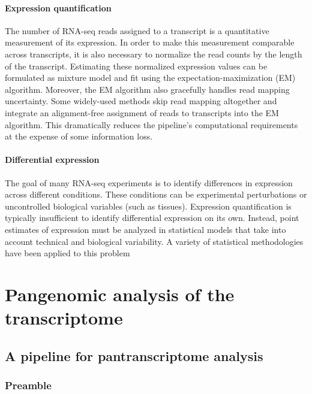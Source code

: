 \documentclass[11pt]{ucthesis}
\begin{document}
\subsection{Expression quantification}

The number of RNA-seq reads assigned to a transcript is a quantitative measurement of its expression. In order to make this measurement comparable across transcripts, it is also necessary to normalize the read counts by the length of the transcript\cite{wagner2012measurement,patro2017salmon}. Estimating these normalized expression values can be formulated as mixture model and fit using the expectation-maximization (EM) algorithm\cite{li2009rna}. Moreover, the EM algorithm also gracefully handles read mapping uncertainty. Some widely-used methods skip read mapping altogether and integrate an alignment-free assignment of reads to transcripts into the EM algorithm\cite{bray2016near,patro2017salmon}. This dramatically reduces the pipeline's computational requirements at the expense of some information loss.

\subsection{Differential expression}

The goal of many RNA-seq experiments is to identify differences in expression across different conditions. These conditions can be experimental perturbations or uncontrolled biological variables (such as tissues). Expression quantification is typically insufficient to identify differential expression on its own. Instead, point estimates of expression must be analyzed in statistical models that take into account technical and biological variability. A variety of statistical methodologies have been applied to this problem\cite{robinson2010edger,tarazona2011differential,love2014moderated,law2014voom}

\part{Pangenomic analysis of the transcriptome}

\chapter{A pipeline for pantranscriptome analysis}
\label{chapter:mpmap}

\section{Preamble}
\end{document}
